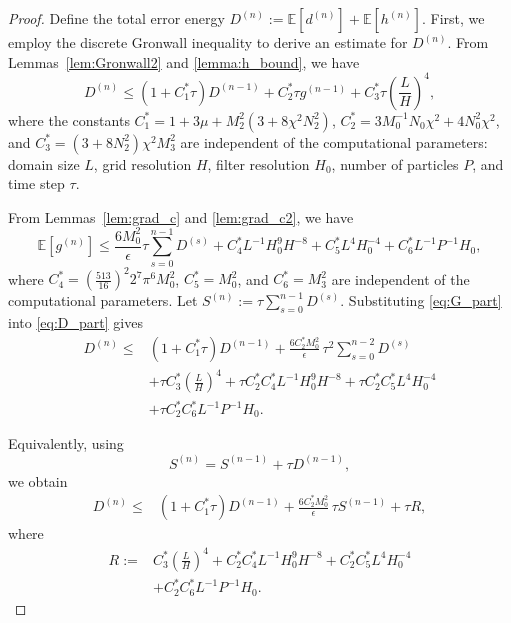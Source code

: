 \documentclass[review,onefignum,onetabnum]{siamart250211}
\begin{document}
\begin{proof}
Define the total error energy \(D^{(n)}:=\mathbb{E}[d^{(n)}]+\mathbb{E}[h^{(n)}]\). First, we employ the discrete Gronwall inequality to derive an estimate for \(D^{(n)}\). From Lemmas~\ref{lem:Gronwall2} and \ref{lemma:h_bound}, we have
\begin{equation}
\label{eq:D_part}
D^{(n)}
\leq
(1+C_1^*\tau)D^{(n-1)}
+C_2^*\tau g^{(n-1)}
+C_3^*\tau\left(\frac{L}{H}\right)^4,
\end{equation}
where the constants
\(C_1^*=1+3\mu+M_2^2(3+8\chi^2N_2^2)\),
\(C_2^*=3M_0^{-1}N_0\chi^2+4N_0^2\chi^2\), and
\(C_3^*=(3+8N_2^2)\chi^2M_3^2\)
are independent of the computational parameters: domain size \(L\), grid resolution \(H\), filter resolution \(H_0\), number of particles \(P\), and time step \(\tau\).

From Lemmas~\ref{lem:grad_c} and \ref{lem:grad_c2}, we have
\begin{equation}
\label{eq:G_part}
\mathbb{E}[g^{(n)}]
\leq
\frac{6M_0^2}{\epsilon}\tau
\sum_{s=0}^{n-1}D^{(s)}
+C_4^*L^{-1}H_0^9H^{-8}
+C_5^*L^4H_0^{-4}
+C_6^*L^{-1}P^{-1}H_0,
\end{equation}
where
\(C_4^*=\left(\frac{513}{16}\right)^2 2^7\pi^6M_0^2\),
\(C_5^*=M_0^2\), and \(C_6^*=M_3^2\)
are independent of the computational parameters.
Let \(
S^{(n)}:=\tau\sum_{s=0}^{n-1}D^{(s)}.
\) Substituting \eqref{eq:G_part} into \eqref{eq:D_part} gives
\begin{equation}
\label{eq:D_combined}
\begin{aligned}
D^{(n)}
\leq{}&
(1+C_1^*\tau)D^{(n-1)}
+\frac{6C_2^*M_0^2}{\epsilon}\,
\tau^2\sum_{s=0}^{n-2}D^{(s)} \\
&+\tau C_3^*\left(\frac{L}{H}\right)^4
+\tau C_2^*C_4^*L^{-1}H_0^9H^{-8}
+\tau C_2^*C_5^*L^4H_0^{-4} \\
&+\tau C_2^*C_6^*L^{-1}P^{-1}H_0.
\end{aligned}
\end{equation}

Equivalently, using
\[
S^{(n)}=S^{(n-1)}+\tau D^{(n-1)},
\]
we obtain
\begin{equation}
\label{eq:D_S_coupled}
\begin{aligned}
D^{(n)}
\leq{}&
(1+C_1^*\tau)D^{(n-1)}
+\frac{6C_2^*M_0^2}{\epsilon}\,
\tau S^{(n-1)}
+\tau R,
\end{aligned}
\end{equation}
where
\begin{equation}
\label{eq:R_definition}
\begin{aligned}
R:={}&
C_3^*\left(\frac{L}{H}\right)^4
+C_2^*C_4^*L^{-1}H_0^9H^{-8}
+C_2^*C_5^*L^4H_0^{-4} \\
&+C_2^*C_6^*L^{-1}P^{-1}H_0.
\end{aligned}
\end{equation}


\end{proof}
\end{document}

